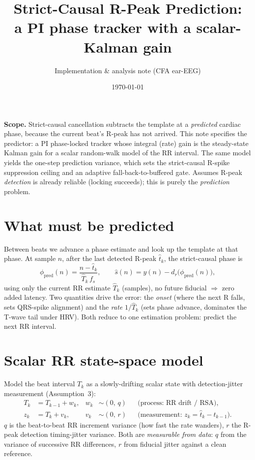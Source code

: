 \documentclass[11pt]{article}
\title{\vspace{-2em}\bfseries Strict-Causal R-Peak Prediction:\\
a PI phase tracker with a scalar-Kalman gain}
\author{Implementation \& analysis note (CFA ear-EEG)}
\date{\today}
\newcommand{\RRhat}{\widehat{T}}
\newcommand{\that}{\hat{t}}
\begin{document}
\maketitle
\vspace{-1.5em}

\noindent
\textbf{Scope.} Strict-causal cancellation subtracts the template at a \emph{predicted} cardiac
phase, because the current beat's R-peak has not arrived. This note specifies the predictor:
a PI phase-locked tracker whose integral (rate) gain is the steady-state Kalman gain for a scalar
random-walk model of the RR interval. The same model yields the one-step prediction variance, which
sets the strict-causal R-spike suppression ceiling and an adaptive fall-back-to-buffered gate.
Assumes R-peak \emph{detection} is already reliable (locking succeeds); this is purely the
\emph{prediction} problem.

\section{What must be predicted}

Between beats we advance a phase estimate and look up the template at that phase. At sample $n$,
after the last detected R-peak $\that_k$, the strict-causal phase is
\begin{equation}
\phi_{\mathrm{pred}}(n) = \frac{n - \that_k}{\RRhat_k\, f_s},
\qquad
\hat{s}(n) = y(n) - \hat{d}_r\bigl(\phi_{\mathrm{pred}}(n)\bigr),
\label{eq:pred}
\end{equation}
using only the current RR estimate $\RRhat_k$ (samples), no future fiducial $\Rightarrow$ zero added
latency. Two quantities drive the error: the \emph{onset} (where the next R falls, sets QRS-spike
alignment) and the \emph{rate} $1/\RRhat_k$ (sets phase advance, dominates the T-wave tail under HRV).
Both reduce to one estimation problem: predict the next RR interval.

\section{Scalar RR state-space model}

Model the beat interval $T_k$ as a slowly-drifting scalar state with detection-jitter measurement
(Assumption~3):
\begin{align}
T_k &= T_{k-1} + w_k, & w_k &\sim (0,\, q) && \text{(process: RR drift / RSA)}, \label{eq:proc}\\
z_k &= T_k + v_k,      & v_k &\sim (0,\, r) && \text{(measurement: } z_k=\that_k-\that_{k-1}\text{)}. \label{eq:meas}
\end{align}
$q$ is the beat-to-beat RR increment variance (how fast the rate wanders), $r$ the R-peak detection
timing-jitter variance. Both are \emph{measurable from data}: $q$ from the variance of successive
RR differences, $r$ from fiducial jitter against a clean reference.
\end{document}
